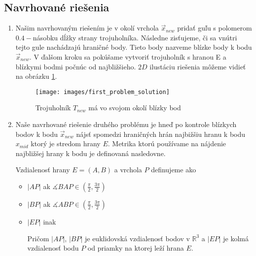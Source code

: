 \subsection{Navrhované riešenia}

\begin{enumerate}
\item{
    Našim navrhovaným riešením je v okolí vrchola $\overrightarrow{x}_{new}$ pridať guľu s polomerom 
    $0.4-$násobku dĺžky strany trojuholníka. Následne zisťujeme, či sa vnútri tejto gule nachádzajú 
    hraničné body. Tieto body nazveme blízke body k bodu $\overrightarrow{x}_{new}$. V ďalšom kroku 
    sa pokúšame vytvoriť trojuholník s hranou E a blízkymi bodmi počnúc od najbližšieho. $2D$ ilustáciu 
    riešenia môžeme vidieť na obrázku \ref{obr:first_problem_solution}. 

    \begin{figure}
        \centerline{\texttt{[image: images/first\_problem\_solution]}}
        \caption[Trojuholník $T_{new}$ má vo svojom okolí blízky bod]{Trojuholník $T_{new}$ má vo svojom okolí blízky bod}
        \label{obr:first_problem_solution}
    \end{figure}
}

\item{

    Naše navrhované riešenie druhého problému je hneď po kontrole blízkych bodov k bodu 
    $\overrightarrow{x}_{new}$ nájsť spomedzi hraničných hrán najbižšiu hranu k bodu $x_{mid}$
    ktorý je stredom hrany $E$. 
    Metrika ktorú používame na nájdenie najbližšej hrany k bodu je definovaná nasledovne.

    \begin{definition} Vzdialenosť hrany $E=(A,B)$ a vrchola $P$ definujeme ako
    \begin{itemize}
        \item{
            $|AP|$ ak $\measuredangle BAP \in (\frac{\pi}{2}, \frac{3\pi}{2})$
        }

        \item{
            $|BP|$ ak $\measuredangle ABP \in (\frac{\pi}{2}, \frac{3\pi}{2})$
        }

        \item{
            $|EP|$ inak
        }

        
        Pričom $|AP|$, $|BP|$ je euklidovská vzdialenosť bodov v $\mathbb{R}^3$ a $|EP|$ je kolmá 
        vzdialenosť bodu $P$ od priamky na ktorej leží hrana $E$.
    \end{itemize}


\end{definition}}
\end{enumerate}

